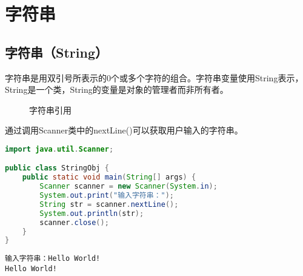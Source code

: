 \newpage

\section{字符串}

\subsection{字符串（String）}

字符串是用双引号所表示的0个或多个字符的组合。字符串变量使用String表示，String是一个类，String的变量是对象的管理者而非所有者。

\begin{figure}[H]
	\centering
	\caption{字符串引用}
\end{figure}

通过调用Scanner类中的nextLine()可以获取用户输入的字符串。\\


\begin{lstlisting}[language=Java]
import java.util.Scanner;

public class StringObj {
	public static void main(String[] args) {
		Scanner scanner = new Scanner(System.in);
		System.out.print("输入字符串：");
		String str = scanner.nextLine();
		System.out.println(str);
		scanner.close();
	}
}
\end{lstlisting}

\begin{tcolorbox}
	\begin{verbatim}
输入字符串：Hello World!
Hello World!
	\end{verbatim}
\end{tcolorbox}

